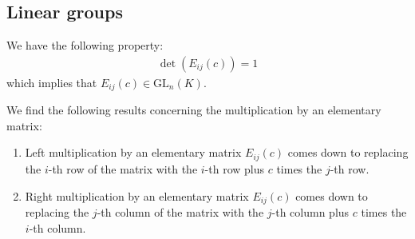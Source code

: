 \subsection{Linear groups}\label{linalgebra:section:linear_groups}
        
        \begin{property}
        	We have the following property:
		\begin{gather}
			\det(E_{ij}(c)) = 1
		\end{gather}
		which implies that $E_{ij}(c)\in\text{GL}_n(K)$.
	\end{property}
        \begin{property}
		We find the following results concerning the multiplication by an elementary matrix:
	        \begin{enumerate}
			\item Left multiplication by an elementary matrix $E_{ij}(c)$ comes down to replacing the $i$-th row of the matrix with the $i$-th row plus $c$ times the $j$-th row.
                	\item Right multiplication by an elementary matrix $E_{ij}(c)$ comes down to replacing the $j$-th column of the matrix with the $j$-th column plus $c$ times the $i$-th column.
		\end{enumerate}
		\end{property}
        

